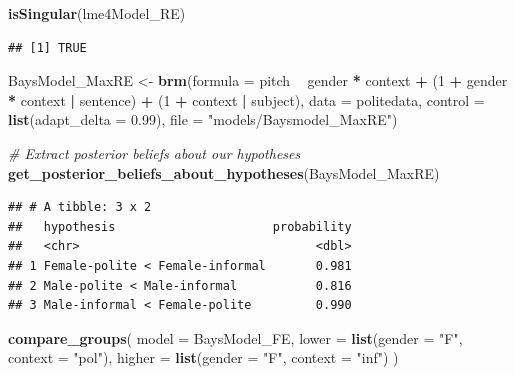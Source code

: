 \documentclass[]{book}
\newenvironment{Shaded}{\begin{snugshade}}{\end{snugshade}}
\newcommand{\CommentTok}[1]{\textcolor[rgb]{0.56,0.35,0.01}{\textit{#1}}}
\newcommand{\DataTypeTok}[1]{\textcolor[rgb]{0.13,0.29,0.53}{#1}}
\newcommand{\DecValTok}[1]{\textcolor[rgb]{0.00,0.00,0.81}{#1}}
\newcommand{\FloatTok}[1]{\textcolor[rgb]{0.00,0.00,0.81}{#1}}
\newcommand{\KeywordTok}[1]{\textcolor[rgb]{0.13,0.29,0.53}{\textbf{#1}}}
\newcommand{\NormalTok}[1]{#1}
\newcommand{\OperatorTok}[1]{\textcolor[rgb]{0.81,0.36,0.00}{\textbf{#1}}}
\newcommand{\StringTok}[1]{\textcolor[rgb]{0.31,0.60,0.02}{#1}}
\begin{document}
\begin{Shaded}
\begin{Highlighting}[]
\KeywordTok{isSingular}\NormalTok{(lme4Model_RE)}
\end{Highlighting}
\end{Shaded}

\begin{verbatim}
## [1] TRUE
\end{verbatim}

\begin{Shaded}
\begin{Highlighting}[]
\NormalTok{BaysModel_MaxRE <-}\StringTok{ }\KeywordTok{brm}\NormalTok{(}\DataTypeTok{formula =}\NormalTok{ pitch }\OperatorTok{~}\StringTok{ }\NormalTok{gender }\OperatorTok{*}\StringTok{ }\NormalTok{context }\OperatorTok{+}
\StringTok{                    }\NormalTok{(}\DecValTok{1} \OperatorTok{+}\StringTok{ }\NormalTok{gender }\OperatorTok{*}\StringTok{ }\NormalTok{context }\OperatorTok{|}\StringTok{ }\NormalTok{sentence) }\OperatorTok{+}
\StringTok{                    }\NormalTok{(}\DecValTok{1} \OperatorTok{+}\StringTok{ }\NormalTok{context }\OperatorTok{|}\StringTok{ }\NormalTok{subject),}
                  \DataTypeTok{data =}\NormalTok{ politedata,}
                  \DataTypeTok{control =} \KeywordTok{list}\NormalTok{(}\DataTypeTok{adapt_delta =} \FloatTok{0.99}\NormalTok{),}
                  \DataTypeTok{file =} \StringTok{"models/Baysmodel_MaxRE"}\NormalTok{)}
\end{Highlighting}
\end{Shaded}

\begin{Shaded}
\begin{Highlighting}[]
\CommentTok{# Extract posterior beliefs about our hypotheses}
\KeywordTok{get_posterior_beliefs_about_hypotheses}\NormalTok{(BaysModel_MaxRE)}
\end{Highlighting}
\end{Shaded}

\begin{verbatim}
## # A tibble: 3 x 2
##   hypothesis                      probability
##   <chr>                                 <dbl>
## 1 Female-polite < Female-informal       0.981
## 2 Male-polite < Male-informal           0.816
## 3 Male-informal < Female-polite         0.990
\end{verbatim}

\begin{Shaded}
\begin{Highlighting}[]
\KeywordTok{compare_groups}\NormalTok{(}
  \DataTypeTok{model =}\NormalTok{ BaysModel_FE, }
  \DataTypeTok{lower =} \KeywordTok{list}\NormalTok{(}\DataTypeTok{gender =} \StringTok{"F"}\NormalTok{, }\DataTypeTok{context =} \StringTok{"pol"}\NormalTok{), }
  \DataTypeTok{higher =} \KeywordTok{list}\NormalTok{(}\DataTypeTok{gender =} \StringTok{"F"}\NormalTok{, }\DataTypeTok{context =} \StringTok{"inf"}\NormalTok{)}
\NormalTok{)}
\end{Highlighting}
\end{Shaded}
\end{document}
